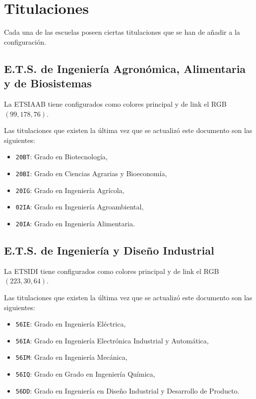 \documentclass[%
    school=etsisi,%
    degree=61TI,%
]{upm-report}
\begin{document}
\section{Titulaciones}

Cada una de las escuelas poseen ciertas titulaciones que se han de añadir a la configuración.

\subsection{E.T.S. de Ingeniería Agronómica, Alimentaria y de Biosistemas}

La ETSIAAB tiene configurados como colores principal y de link el RGB $(99,178,76)$.

Las titulaciones que existen la última vez que se actualizó este documento son las siguientes:

\begin{itemize}
    \item \texttt{20BT}: Grado en Biotecnología,
    \item \texttt{20BI}: Grado en Ciencias Agrarias y Bioeconomía,
    \item \texttt{20IG}: Grado en Ingeniería Agrícola,
    \item \texttt{02IA}: Grado en Ingeniería Agroambiental,
    \item \texttt{20IA}: Grado en Ingeniería Alimentaria.
\end{itemize}

\subsection{E.T.S. de Ingeniería y Diseño Industrial}

La ETSIDI tiene configurados como colores principal y de link el RGB $(223,30,64)$.

Las titulaciones que existen la última vez que se actualizó este documento son las siguientes:

\begin{itemize}
    \item \texttt{56IE}: Grado en Ingeniería Eléctrica,
    \item \texttt{56IA}: Grado en Ingeniería Electrónica Industrial y Automática,
    \item \texttt{56IM}: Grado en Ingeniería Mecánica,
    \item \texttt{56IQ}: Grado en Grado en Ingeniería Química,
    \item \texttt{56DD}: Grado en Ingeniería en Diseño Industrial y Desarrollo de Producto.
\end{itemize}
\end{document}
